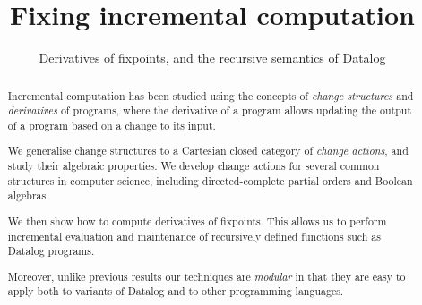 
%


\usepackage[utf8]{inputenc}
\usepackage{amsmath}
\usepackage{amssymb}
\usepackage{amsthm}
\usepackage{mathtools}
\usepackage{stmaryrd}
\usepackage{thmtools}
\usepackage{todonotes}
\usepackage{etoolbox}
\usepackage{appendix}

\usepackage[
  safeinputenc,
  natbib=true
]{biblatex}
\usepackage{cleveref}
\usepackage{hyperref}

\newcommand{\todoall}[1]{\todo[inline,color=black!30,author=All]{#1}}
\newcommand{\todompj}[1]{\todo[inline,color=yellow!40,author=Michael]{#1}}
\newcommand{\todomario}[1]{\todo[inline,color=blue!40,author=Mario]{#1}}



\newif\ifproofs





%


\begin{abstract}
  Incremental computation has been studied using the concepts of \emph{change
  structures} and \emph{derivatives} of programs, where the derivative of a program allows updating the output
  of a program based on a change to its input.

  We generalise change structures to a Cartesian closed category of \emph{change actions},
  and study their algebraic properties. We develop change actions for several common structures
  in computer science, including directed-complete partial orders and Boolean algebras.

  We then show how to compute derivatives of fixpoints. This allows us to
  perform incremental evaluation and maintenance of recursively defined
  functions such as Datalog programs.

  Moreover, unlike previous results our techniques are \emph{modular} in that
  they are easy to apply both to variants of Datalog and to other programming languages.
\end{abstract}

\title{Fixing incremental computation}
\subtitle{Derivatives of fixpoints, and the recursive semantics of Datalog}

\maketitle

